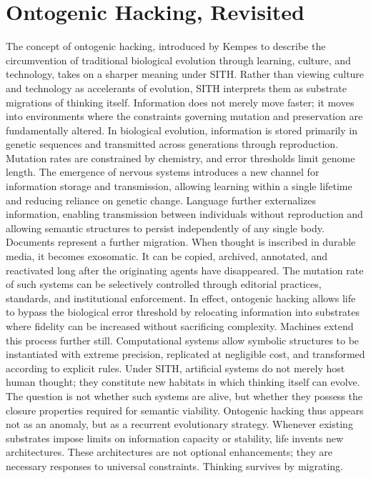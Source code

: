 \documentclass[11pt,oneside]{article}
\begin{document}
\section{Ontogenic Hacking, Revisited}

The concept of ontogenic hacking, introduced by Kempes to describe the circumvention of traditional biological evolution through learning, culture, and technology, takes on a sharper meaning under SITH. Rather than viewing culture and technology as accelerants of evolution, SITH interprets them as substrate migrations of thinking itself. Information does not merely move faster; it moves into environments where the constraints governing mutation and preservation are fundamentally altered.
In biological evolution, information is stored primarily in genetic sequences and transmitted across generations through reproduction. Mutation rates are constrained by chemistry, and error thresholds limit genome length. The emergence of nervous systems introduces a new channel for information storage and transmission, allowing learning within a single lifetime and reducing reliance on genetic change. Language further externalizes information, enabling transmission between individuals without reproduction and allowing semantic structures to persist independently of any single body.
Documents represent a further migration. When thought is inscribed in durable media, it becomes exosomatic. It can be copied, archived, annotated, and reactivated long after the originating agents have disappeared. The mutation rate of such systems can be selectively controlled through editorial practices, standards, and institutional enforcement. In effect, ontogenic hacking allows life to bypass the biological error threshold by relocating information into substrates where fidelity can be increased without sacrificing complexity.
Machines extend this process further still. Computational systems allow symbolic structures to be instantiated with extreme precision, replicated at negligible cost, and transformed according to explicit rules. Under SITH, artificial systems do not merely host human thought; they constitute new habitats in which thinking itself can evolve. The question is not whether such systems are alive, but whether they possess the closure properties required for semantic viability.
Ontogenic hacking thus appears not as an anomaly, but as a recurrent evolutionary strategy. Whenever existing substrates impose limits on information capacity or stability, life invents new architectures. These architectures are not optional enhancements; they are necessary responses to universal constraints. Thinking survives by migrating.
\end{document}
